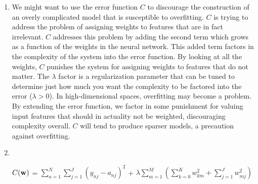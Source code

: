 \documentclass[solution, letterpaper]{cs121}
\begin{document}
\problem{}
\begin{enumerate}
	\item We might want to use the error function $C$ to discourage the construction of an overly complicated model that is susceptible to overfitting. $C$ is trying to address the problem of assigning weights to features that are in fact irrelevant. $C$ addresses this problem by adding the second term which grows as a function of the weights in the neural network. This added term factors in the complexity of the system into the error function. By looking at all the weights, $C$ punishes the system for assigning weights to features that do not matter. The $\lambda$ factor is a regularization parameter that can be tuned to determine just how much you want the complexity to be factored into the error ($\lambda > 0$). In high-dimensional spaces, overfitting may become a problem. By extending the error function, we factor in some punishment for valuing input features that should in actuality not be weighted, discouraging complexity overall. $C$ will tend to produce sparser models, a precaution against overfitting. 
	\item \hfill \\
\begin{center}
	$C({\bf w})$ = $\displaystyle\sum\limits_{n=1}^N \displaystyle\sum\limits_{j=1}^J (y_{nj} - a_{nj})^2$ +  $\lambda \displaystyle\sum\limits_{m=1}^M 
	\left(\displaystyle\sum\limits_{k=0}^K  w_{km}^2 +
	\displaystyle\sum\limits_{j=1}^J w_{mj}^2\right)$
	
\end{center}

\end{enumerate}
\end{document}
